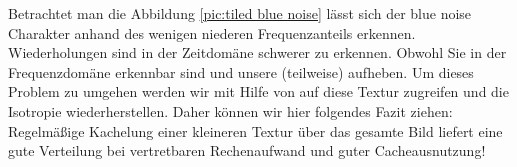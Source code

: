 Betrachtet man die Abbildung \ref{pic:tiled blue noise} lässt sich der blue noise Charakter anhand des
wenigen niederen Frequenzanteils erkennen. Wiederholungen sind in der Zeitdomäne schwerer zu erkennen. 
Obwohl Sie in der Frequenzdomäne erkennbar sind und unsere 
(teilweise) aufheben. Um dieses Problem zu umgehen werden wir mit Hilfe von 
auf diese Textur zugreifen und die Isotropie wiederherstellen.
Daher können wir hier folgendes Fazit ziehen: Regelmäßige Kachelung einer kleineren  Textur 
über das gesamte Bild liefert eine gute  Verteilung bei vertretbaren Rechenaufwand und guter 
Cacheausnutzung!
